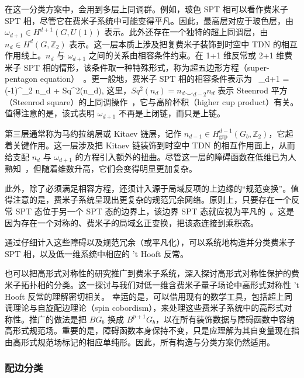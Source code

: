 在这一分类方案中，会用到多层上同调群。例如，玻色 SPT 相可以看作费米子 SPT 相，尽管它在费米子系统中可能变得平凡。因此，最高层对应于玻色层，由 $\omega_{d+1} \in H^{d+1}(G,U(1))$ 表示。此外还存在一个独特的超上同调层，由 $n_d \in H^d(G,\mathbb{Z}_2)$ 表示。这一层本质上涉及把复费米子装饰到时空中 TDN 的相互作用线上。$n_d$ 与 $\omega_{d+1}$ 之间的关系由相容条件约束。在 1+1 维反常或 2+1 维费米子 SPT 相的情形，该条件取一种特殊形式，称为超五边形方程（super-pentagon equation）~\cite{gu2014lattice,gu2015classification}。更一般地，费米子 SPT 相的相容条件表示为~\cite{gu2014symmetry,wang2020construction}
\be
\dd \omega_{d+1} = (-1)^{\lambda_2 \smile n_d + Sq^2(n_d)},
\ee
这里，$Sq^2(n_d) = n_d \smile_{d-2} n_d$ 表示 Steenrod 平方（Steenrod square）的上同调操作~\cite{steenrod1947products}，它与高阶杯积（higher cup product）有关。值得注意的是，该式表明 $\omega_{d+1}$ 不再是上闭链，而只是上链。

第三层通常称为马约拉纳层或 Kitaev 链层，记作 $n_{d-1} \in H^{d-1}_\mathrm{grp}(G_b,\mathbb{Z}_2)$，它起着关键作用。这一层涉及把 Kitaev 链装饰到时空中 TDN 的相互作用面上，从而给支配 $n_d$ 与 $\omega_{d+1}$ 的方程引入额外的扭曲。尽管这一层的障碍函数在低维已为人熟知~\cite{wang2018towards,wang2020construction,kapustin2017fermionic,brumfiel2016pontrjagin,brumfiel2018pontrjagin}，但随着维数升高，它们会变得明显更加复杂。

此外，除了必须满足相容方程，还须计入源于局域反项的上边缘的“规范变换”。值得注意的是，费米子系统呈现出更复杂的规范冗余网络。原则上，只要存在一个反常 SPT 态位于另一个 SPT 态的边界上，该边界 SPT 态就应视为平凡的~\cite{wang2019anomalous}。这是因为存在一个对称的、费米子的局域幺正变换，把该态连接到乘积态。

通过仔细计入这些障碍以及规范冗余（或平凡化），可以系统地构造并分类费米子 SPT 相，以及低一维系统中相应的 't Hooft 反常。

也可以把高形式对称性的研究推广到费米子系统，深入探讨高形式对称性保护的费米子拓扑相的分类。这一探讨与我们对低一维含费米子量子场论中高形式对称性 't Hooft 反常的理解密切相关。
幸运的是，可以借用现有的数学工具，包括超上同调理论与自旋配边理论（spin cobordism），来处理这些费米子系统中的高形式对称性。推广的做法是把 $BG_b$ 换成 $B^{p+1}G_b$，以在所有装饰数据与障碍函数中容纳高形式规范场。重要的是，障碍函数本身保持不变，只是应理解为其自变量现在指由高形式规范场标记的相应单纯形。因此，所有构造与分类方案仍然适用。

\subsubsection{配边分类}

